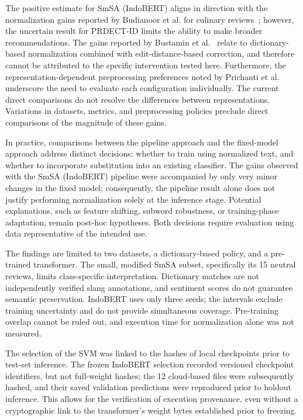 The positive estimate for SmSA (IndoBERT) aligns in direction with the normalization gains reported by Budianoor et al. for culinary reviews~\cite{budianoor2026}; however, the uncertain result for PRDECT-ID limits the ability to make broader recommendations. The gains reported by Bustamin et al.~\cite{bustamin2025} relate to dictionary-based normalization combined with edit-distance-based correction, and therefore cannot be attributed to the specific intervention tested here. Furthermore, the representation-dependent preprocessing preferences noted by Prichanti et al.~\cite{prichanti2026} underscore the need to evaluate each configuration individually. The current direct comparisons do not resolve the differences between representations. Variations in datasets, metrics, and preprocessing policies preclude direct comparisons of the magnitude of these gains.

In practice, comparisons between the pipeline approach and the fixed-model approach address distinct decisions: whether to train using normalized text, and whether to incorporate substitution into an existing classifier. The gains observed with the SmSA (IndoBERT) pipeline were accompanied by only very minor changes in the fixed model; consequently, the pipeline result alone does not justify performing normalization solely at the inference stage. Potential explanations, such as feature shifting, subword robustness, or training-phase adaptation, remain post-hoc hypotheses. Both decisions require evaluation using data representative of the intended use.

The findings are limited to two datasets, a dictionary-based policy, and a pre-trained transformer. The small, modified SmSA subset, specifically its 15 neutral reviews, limits class-specific interpretation. Dictionary matches are not independently verified slang annotations, and sentiment scores do not guarantee semantic preservation. IndoBERT uses only three seeds; the intervals exclude training uncertainty and do not provide simultaneous coverage. Pre-training overlap cannot be ruled out, and execution time for normalization alone was not measured.

The selection of the SVM was linked to the hashes of local checkpoints prior to test-set inference. The frozen IndoBERT selection recorded versioned checkpoint identifiers, but not full-weight hashes; the 12 cloud-based files were subsequently hashed, and their saved validation predictions were reproduced prior to holdout inference. This allows for the verification of execution provenance, even without a cryptographic link to the transformer's weight bytes established prior to freezing.


